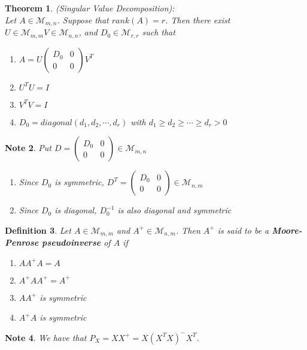 \documentclass[12pt]{amsart}
\newtheorem{thm}{Theorem}[section]
\newtheorem{defn}[thm]{Definition}
\newtheorem{note}[thm]{Note}
\newcommand{\MM}{\mathcal{M}}
\begin{document}
\begin{thm} (Singular Value Decomposition): \\
Let $A \in \MM_{m,n}$. Suppose that $rank(A) = r$. Then there exist $U \in \MM_{m,m} V \in \MM_{n,n}$, and $D_0 \in \MM_{r,r}$ such that
\begin{enumerate}
\item $A = 
U
\begin{pmatrix}
D_0 & 0 \\
0 & 0
\end{pmatrix}
V^T
$
\item  
$U^T
U = I$
\item $V^T
V = I$ 
\item $D_0 = diagonal(d_1, d_2, \cdots, d_r)$ with $d_1 \geq d_2 \geq \cdots \geq d_r >0$
\end{enumerate}

\end{thm}

\begin{note}
Put $D = 
\begin{pmatrix}
D_0 & 0 \\
0 & 0
\end{pmatrix} \in \MM_{m,n}$ 
\begin{enumerate}
\item Since $D_0$ is symmetric, $D^T = 
\begin{pmatrix}
D_0 & 0 \\
0 & 0
\end{pmatrix}  \in \MM_{n,m}$
\item Since $D_0$ is diagonal, $D_0^{-1}$ is also diagonal and symmetric
\end{enumerate}
\end{note}

\begin{defn}
Let $A \in \MM_{m,m}$ and $A^+ \in \MM_{n,m}$. Then $A^+$ is said to be a  \textbf{Moore-Penrose pseudoinverse} of $A$ if 
\begin{enumerate}
\item $AA^+A = A$
\item $A^+AA^+ = A^+$
\item $AA^+$ is symmetric
\item $A^+A$ is symmetric
\end{enumerate} 
\end{defn}

\begin{note}
We have that $P_X = XX^+ = X(X^TX)^-X^T$. 
\end{note}
\end{document}
